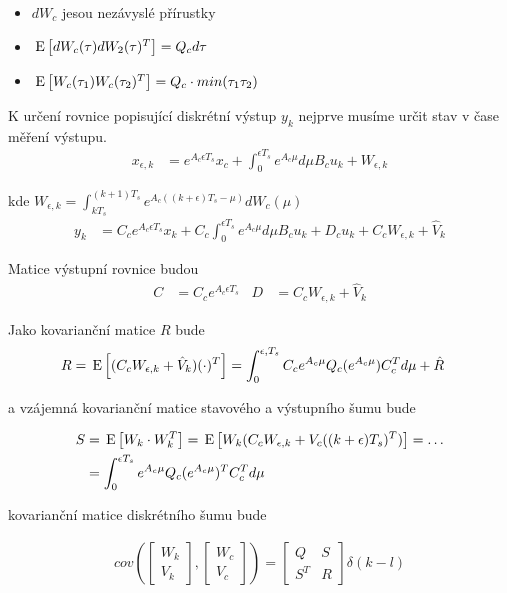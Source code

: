 \begin{itemize}
  \item $d W_c$ jesou nezávyslé přírustky
  \item $\,\mathrm{E}\left[d W_c (\tau) d W_2 (\tau)^T \right] = Q_c d \tau$
  \item $\,\mathrm{E}\left[W_c (\tau_1) W_c (\tau_2)^T\right] = Q_c \cdot min( \tau_1 \tau_2)$
\end{itemize}
K určení rovnice popisující diskrétní výstup $y_k$ nejprve musíme určit stav v čase měření výstupu.
\begin{align}
  x_{\epsilon,k} &= e^{A_c \epsilon T_s} x_c + \int_0^{\epsilon T_s} e^{A_c \mu} d \mu B_c u_k + W_{\epsilon, k}
\end{align}

kde $W_{\epsilon, k} = \int_{kT_s}^{(k+1)T_s} e^{A_c((k+\epsilon)T_s -\mu)} d W_c(\mu)$
\begin{align}
  y_k &= C_c e^{A_c \epsilon T_s} x_k + C_c \int_0^{\epsilon T_s} e^{A_c \mu} d \mu B_c u_k + D_c u_k + C_c W_{\epsilon,k} + \hat{V}_k
\end{align}

Matice výstupní rovnice budou
\begin{align}
  C &= C_c e^{A_c \epsilon T_s} \;\;\; D &= C_c W_{\epsilon,k} + \hat{V}_k
\end{align}

Jako kovarianční matice $R$ bude
\begin{align}
  R &= \,\mathrm{E}\left[(C_c W_{\epsilon,k} + \hat{V}_k)(\cdot)^T \right] = \int_0^{\epsilon,T_s} C_c e^{A_c \mu} Q_c ( e^{A_c \mu} ) C_c^T d \mu + \hat{R}
\end{align}

a vzájemná kovarianční matice stavového a výstupního šumu bude

\begin{align}
  S &= \,\mathrm{E}\left[W_k \cdot W_k^T\right] = \,\mathrm{E}\left[W_k (C_c W_{\epsilon,k} +V_c((k+\epsilon)T_s)^T) \right] = \ldots \\
  &= \int_0^{\epsilon T_s} e^{A_c \mu} Q_c (e^{A_c \mu})^T C_c^T d \mu
\end{align}

kovarianční matice diskrétního šumu bude

\begin{align}
  cov(\begin{bmatrix}W_k \\ V_k \end{bmatrix}, \begin{bmatrix}W_c \\ V_c \end{bmatrix} ) = \begin{bmatrix} Q & S \\ S^T & R \end{bmatrix} \delta(k-l)
\end{align}

